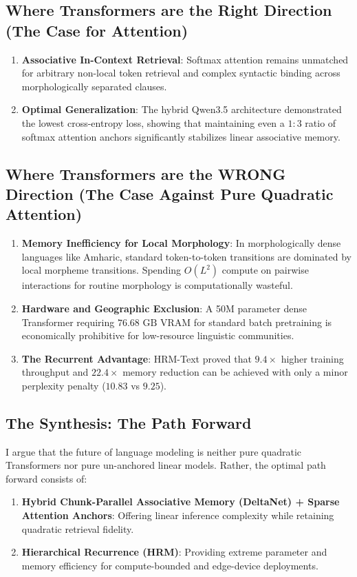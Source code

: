 \documentclass[11pt,a4paper]{article}
\begin{document}
\subsection{Where Transformers are the Right Direction (The Case for Attention)}
\begin{enumerate}
    \item \textbf{Associative In-Context Retrieval}: Softmax attention remains unmatched for arbitrary non-local token retrieval and complex syntactic binding across morphologically separated clauses.
    \item \textbf{Optimal Generalization}: The hybrid Qwen3.5 architecture demonstrated the lowest cross-entropy loss, showing that maintaining even a $1:3$ ratio of softmax attention anchors significantly stabilizes linear associative memory.
\end{enumerate}

\subsection{Where Transformers are the WRONG Direction (The Case Against Pure Quadratic Attention)}
\begin{enumerate}
    \item \textbf{Memory Inefficiency for Local Morphology}: In morphologically dense languages like Amharic, standard token-to-token transitions are dominated by local morpheme transitions. Spending $O(L^2)$ compute on pairwise interactions for routine morphology is computationally wasteful.
    \item \textbf{Hardware and Geographic Exclusion}: A 50M parameter dense Transformer requiring $76.68\text{ GB}$ VRAM for standard batch pretraining is economically prohibitive for low-resource linguistic communities.
    \item \textbf{The Recurrent Advantage}: HRM-Text proved that $9.4\times$ higher training throughput and $22.4\times$ memory reduction can be achieved with only a minor perplexity penalty ($10.83$ vs $9.25$).
\end{enumerate}

\subsection{The Synthesis: The Path Forward}
I argue that the future of language modeling is neither pure quadratic Transformers nor pure un-anchored linear models. Rather, the optimal path forward consists of:
\begin{enumerate}
    \item \textbf{Hybrid Chunk-Parallel Associative Memory (DeltaNet) + Sparse Attention Anchors}: Offering linear inference complexity while retaining quadratic retrieval fidelity.
    \item \textbf{Hierarchical Recurrence (HRM)}: Providing extreme parameter and memory efficiency for compute-bounded and edge-device deployments.
\end{enumerate}
\end{document}
